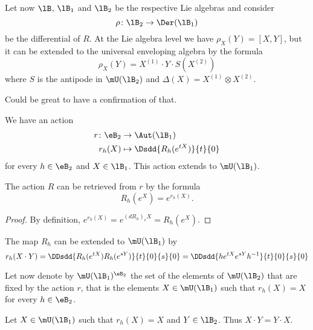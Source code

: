 Let now $\lB$, $\lB_1$ and $\lB_2$ be the respective Lie algebras and consider
\begin{equation}
	\rho\colon \lB_2\to \Der(\lB_1)
\end{equation}
be the differential of $R$. At the Lie algebra level we have $\rho_X(Y)=[X,Y]$, but it can be extended to the universal enveloping algebra by the formula
\begin{equation}
	\rho_X(Y)=X^{(1)}\cdot Y\cdot S(X^{(2)})
\end{equation}
where $S$ is the antipode in $\mU(\lB_2)$ and $\Delta(X)=X^{(1)}\otimes X^{(2)}$.
\begin{probleme}
	Could be great to have a confirmation of that.
\end{probleme}


We have an action
\begin{equation}
	\begin{aligned}
		r\colon \eB_2&\to \Aut(\lB_1) \\
		r_h(X)&\mapsto \Dsdd{ R_h( e^{tX}) }{t}{0}
	\end{aligned}
\end{equation}
for every $h\in\eB_2$ and $X\in\lB_1$. This action extends to $\mU(\lB_1)$.

\begin{lemma}
	The action $R$ can be retrieved from $r$ by the formula
	\begin{equation}
		R_h( e^{X})= e^{r_h(X)}.
	\end{equation}
\end{lemma}

\begin{proof}
	By definition, $ e^{r_h(X)}= e^{(dR_h)_eX}=R_h( e^{X})$.
\end{proof}

The map $R_h$ can be extended to $\mU(\lB_1)$ by
\begin{equation}
	r_h(X\cdot Y)=\DDsdd{ R_h( e^{tX})R_h( e^{sY}) }{t}{0}{s}{0}=\DDsdd{ h e^{tX} e^{sY}h^{-1} }{t}{0}{s}{0}
\end{equation}

Let now denote by $\mU(\lB_1)^{\eB_2}$ the set of the elements of $\mU(\lB_2)$ that are fixed by the action $r$, that is the elements $X\in\mU(\lB_1)$ such that $r_h(X)=X$ for every $h\in\eB_2$.

\begin{lemma}
	Let $X\in\mU(\lB_1)$ such that $r_h(X)=X$ and $Y\in\lB_2$. Thus $X\cdot Y=Y\cdot X$.
\end{lemma}

